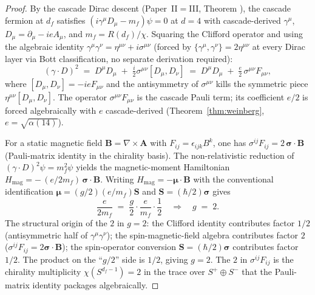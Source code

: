 \documentclass[12pt,a4paper]{article}
\begin{document}
\begin{proof}
By the cascade Dirac descent (Paper~II$=$III, Theorem
), the cascade fermion at $d_f$
satisfies $(i\gamma^\mu D_\mu - m_f)\psi = 0$ at $d=4$ with
cascade-derived $\gamma^\mu$, $D_\mu = \partial_\mu - ieA_\mu$, and
$m_f = R(d_f)/\chi$. Squaring the Clifford operator and using the
algebraic identity
$\gamma^\mu\gamma^\nu = \eta^{\mu\nu} + i\sigma^{\mu\nu}$
(forced by $\{\gamma^\mu,\gamma^\nu\} = 2\eta^{\mu\nu}$ at every
Dirac layer via Bott classification, no separate derivation
required):
\[
(\gamma\cdot D)^2 \;=\; D^\mu D_\mu \;+\; \tfrac{i}{2}\sigma^{\mu\nu}[D_\mu, D_\nu]
\;=\; D^\mu D_\mu \;+\; \tfrac{e}{2}\,\sigma^{\mu\nu} F_{\mu\nu},
\]
where $[D_\mu, D_\nu] = -ie F_{\mu\nu}$ and the antisymmetry of
$\sigma^{\mu\nu}$ kills the symmetric piece
$\eta^{\mu\nu}[D_\mu,D_\nu]$. The operator
$\sigma^{\mu\nu} F_{\mu\nu}$ is the cascade Pauli term; its
coefficient $e/2$ is forced algebraically with $e$ cascade-derived
(Theorem~\ref{thm:weinberg}, $e = \sqrt{\alpha(14)}$).

For a static magnetic field $\mathbf{B} = \nabla\times\mathbf{A}$
with $F_{ij} = \epsilon_{ijk} B^k$, one has
$\sigma^{ij}F_{ij} = 2\,\boldsymbol{\sigma}\cdot\mathbf{B}$
(Pauli-matrix identity in the chirality basis). The
non-relativistic reduction of $(\gamma\cdot D)^2\psi = m_f^2\psi$
yields the magnetic-moment Hamiltonian
$H_{\text{mag}} = -\,(e/2m_f)\,\boldsymbol{\sigma}\cdot\mathbf{B}$. Writing
$H_{\text{mag}} = -\boldsymbol{\mu}\cdot\mathbf{B}$ with the conventional
identification $\boldsymbol{\mu} = (g/2)(e/m_f)\mathbf{S}$ and
$\mathbf{S} = (\hbar/2)\boldsymbol{\sigma}$ gives
\[
\frac{e}{2m_f} \;=\; \frac{g}{2}\cdot\frac{e}{m_f}\cdot\frac{1}{2}
\quad\Longrightarrow\quad g \;=\; 2.
\]
The structural origin of the $2$ in $g=2$: the Clifford identity
contributes factor $1/2$ (antisymmetric half of
$\gamma^\mu\gamma^\nu$); the spin-magnetic-field algebra contributes
factor $2$ ($\sigma^{ij}F_{ij} = 2\boldsymbol{\sigma}\cdot\mathbf{B}$);
the spin-operator conversion $\mathbf{S} = (\hbar/2)\boldsymbol{\sigma}$
contributes factor $1/2$. The product on the ``$g/2$'' side is
$1/2$, giving $g=2$. The $2$ in $\sigma^{ij}F_{ij}$ is the
chirality multiplicity $\chi(S^{d_f - 1}) = 2$ in the trace over
$S^+ \oplus S^-$ that the Pauli-matrix identity packages
algebraically.
\end{proof}
\end{document}

